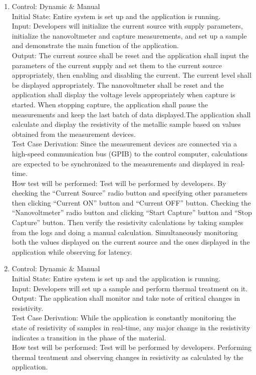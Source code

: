 \documentclass[12pt, titlepage]{article}
\begin{document}
\begin{enumerate}[{FR-T}1.]
    \item Control: Dynamic \& Manual\\
    Initial State: Entire system is set up and the application is running.\\
    Input: Developers will initialize the current source with supply parameters, initialize the nanovoltmeter and capture measurements, and set up a sample and demonstrate the main function of the application.\\
    Output: The current source shall be reset and the application shall input the parameters of the current supply and set them to the current source appropriately, then enabling and disabling the current. The current level shall be displayed appropriately. The nanovoltmeter shall be reset and the application shall display the voltage levels appropriately when capture is started. When stopping capture, the application shall pause the measurements and keep the last batch of data displayed.The application shall calculate and display the resistivity of the metallic sample based on values obtained from the measurement devices.\\
    Test Case Derivation: Since the measurement devices are connected via a high-speed communication bus (GPIB) to the control computer, calculations are expected to be synchronized to the measurements and displayed in real-time.\\
    How test will be performed: Test will be performed by developers. By checking the “Current Source” radio button and specifying other parameters then clicking “Current ON” button and “Current OFF” button. Checking the “Nanovoltmeter” radio button and clicking “Start Capture” button and “Stop Capture” button. Then verify the resistivity calculations by taking samples from the logs and doing a manual calculation. Simultaneously monitoring both the values displayed on the current source and the ones displayed in the application while observing for latency.
    
    \item Control: Dynamic \& Manual\\
    Initial State: Entire system is set up and the application is running.\\
    Input: Developers will set up a sample and perform thermal treatment on it.\\
    Output: The application shall monitor and take note of critical changes in resistivity.\\
    Test Case Derivation: While the application is constantly monitoring the state of resistivity of samples in real-time, any major change in the resistivity indicates a transition in the phase of the material.\\
How test will be performed: Test will be performed by developers. Performing thermal treatment and observing changes in resistivity as calculated by the application.
    

\end{enumerate}
\end{document}
